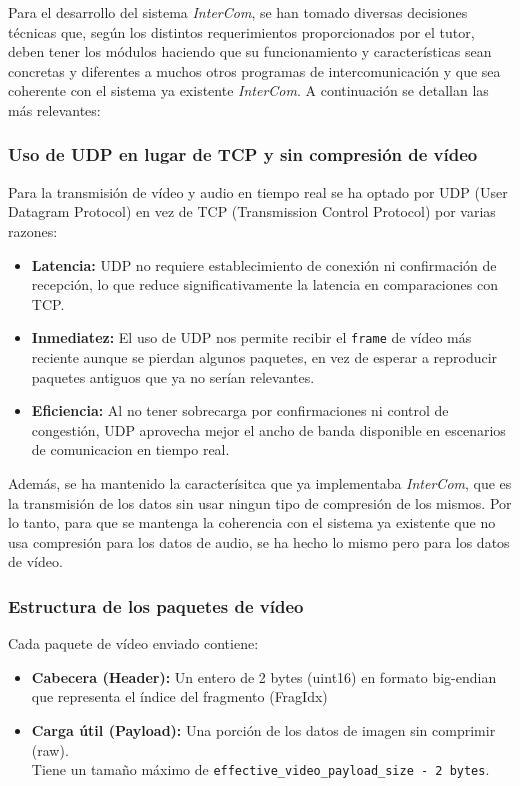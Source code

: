 Para el desarrollo del sistema \textit{InterCom}, se han tomado diversas decisiones técnicas que, según los distintos requerimientos proporcionados por el tutor, deben tener los módulos haciendo que su funcionamiento y características sean concretas y diferentes a muchos otros programas de intercomunicación y que sea coherente con el sistema ya existente \textit{InterCom}. A continuación se detallan las más relevantes:

\subsubsection{Uso de UDP en lugar de TCP y sin compresión de vídeo}

Para la transmisión de vídeo y audio en tiempo real se ha optado por UDP (User Datagram Protocol) en vez de TCP (Transmission Control Protocol) por varias razones:

\begin{itemize} 
    \item \textbf{Latencia:} UDP no requiere establecimiento de conexión ni confirmación de recepción, lo que reduce significativamente la latencia en comparaciones con TCP. \cite{lpi}
    \item \textbf{Inmediatez:} El uso de UDP nos permite recibir el \texttt{frame} de vídeo más reciente aunque se pierdan algunos paquetes, en vez de esperar a reproducir paquetes antiguos que ya no serían relevantes. \cite{rfc768}
    \item \textbf{Eficiencia:} Al no tener sobrecarga por confirmaciones ni control de congestión, UDP aprovecha mejor el ancho de banda disponible en escenarios de comunicacion en tiempo real. \cite{cloudflare_udp}
\end{itemize}

Además, se ha mantenido la caracterísitca que ya implementaba \textit{InterCom}, que es la transmisión de los datos sin usar ningun tipo de compresión de los mismos. Por lo tanto, para que se mantenga la coherencia con el sistema ya existente que no usa compresión para los datos de audio, se ha hecho lo mismo pero para los datos de vídeo.

\subsubsection{Estructura de los paquetes de vídeo}

Cada paquete de vídeo enviado contiene:

\begin{itemize}
    \item \textbf{Cabecera (Header):} Un entero de 2 bytes (uint16) en formato big-endian que representa el índice del fragmento (FragIdx)
    \item \textbf{Carga útil (Payload):} Una porción de los datos de imagen sin comprimir (raw). \\
    Tiene un tamaño máximo de \texttt{effective\_video\_payload\_size - 2 bytes}.
\end{itemize}

